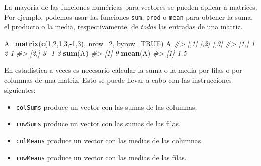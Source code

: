 \documentclass[
]{book}
\newenvironment{Shaded}{\begin{snugshade}}{\end{snugshade}}
\newcommand{\CommentTok}[1]{\textcolor[rgb]{0.56,0.35,0.01}{\textit{#1}}}
\newcommand{\DataTypeTok}[1]{\textcolor[rgb]{0.13,0.29,0.53}{#1}}
\newcommand{\DecValTok}[1]{\textcolor[rgb]{0.00,0.00,0.81}{#1}}
\newcommand{\KeywordTok}[1]{\textcolor[rgb]{0.13,0.29,0.53}{\textbf{#1}}}
\newcommand{\NormalTok}[1]{#1}
\newcommand{\OperatorTok}[1]{\textcolor[rgb]{0.81,0.36,0.00}{\textbf{#1}}}
\newcommand{\OtherTok}[1]{\textcolor[rgb]{0.56,0.35,0.01}{#1}}
\providecommand{\tightlist}{%
  \setlength{\itemsep}{0pt}\setlength{\parskip}{0pt}}
\theoremstyle{definition}
\theoremstyle{definition}
\theoremstyle{definition}
\theoremstyle{remark}
\begin{document}
La mayoría de las funciones numéricas para vectores se pueden aplicar a matrices. Por ejemplo, podemos usar las funciones \texttt{sum}, \texttt{prod} o \texttt{mean} para obtener la suma, el producto o la media, respectivamente, de \emph{todas} las entradas de una matriz.

\begin{Shaded}
\begin{Highlighting}[]
\NormalTok{A=}\KeywordTok{matrix}\NormalTok{(}\KeywordTok{c}\NormalTok{(}\DecValTok{1}\NormalTok{,}\DecValTok{2}\NormalTok{,}\DecValTok{1}\NormalTok{,}\DecValTok{3}\NormalTok{,}\OperatorTok{{-}}\DecValTok{1}\NormalTok{,}\DecValTok{3}\NormalTok{), }\DataTypeTok{nrow=}\DecValTok{2}\NormalTok{, }\DataTypeTok{byrow=}\OtherTok{TRUE}\NormalTok{)}
\NormalTok{A}
\CommentTok{\#\textgreater{}      [,1] [,2] [,3]}
\CommentTok{\#\textgreater{} [1,]    1    2    1}
\CommentTok{\#\textgreater{} [2,]    3   {-}1    3}
\KeywordTok{sum}\NormalTok{(A)}
\CommentTok{\#\textgreater{} [1] 9}
\KeywordTok{mean}\NormalTok{(A)}
\CommentTok{\#\textgreater{} [1] 1.5}
\end{Highlighting}
\end{Shaded}

En estadística a veces es necesario calcular la suma o la media por filas o por columnas de una matriz. Esto se puede llevar a cabo con las instrucciones siguientes:

\begin{itemize}
\tightlist
\item
  \texttt{colSums} produce un vector con las sumas de las columnas.
\item
  \texttt{rowSums} produce un vector con las sumas de las filas.
\item
  \texttt{colMeans} produce un vector con las medias de las columnas.
\item
  \texttt{rowMeans} produce un vector con las medias de las filas.
\end{itemize}
\end{document}
